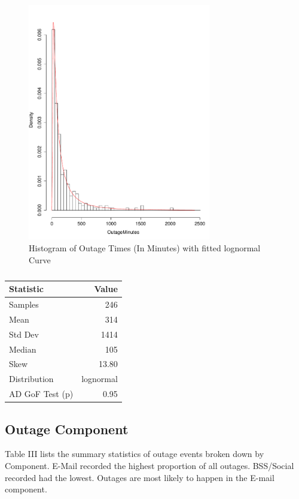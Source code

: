 \documentclass[conference]{IEEEtran}
\begin{document}
\begin{figure}
\begin{center}
\includegraphics[width=8cm]{graph1.pdf} 
\caption{ Histogram of Outage Times (In Minutes) with fitted lognormal Curve}
\end{center}
\label{fig:outagedistribution}
\end{figure}


\begin {table}
\caption{}
\begin{center}
\begin{tabular}{l | r} Statistic & Value 
\\ \hline Samples & 246
\\ Mean & 314
\\ Std Dev & 1414
\\ Median & 105
\\ Skew & 13.80
\\ Distribution & lognormal
\\AD GoF Test (p) & 0.95
\end{tabular}
\end{center}
\end{table}


\subsection{Outage Component}

Table III lists the summary statistics of outage events broken down by Component. E-Mail recorded the highest proportion of all outages. BSS/Social recorded had the lowest. Outages are most likely to happen in the E-mail component. \par
\end{document}
